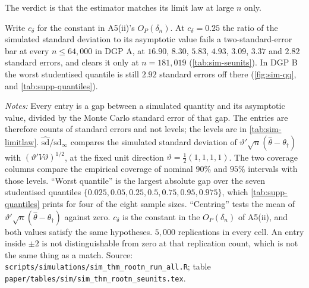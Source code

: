 \documentclass[
  12pt]{article}
\newcommand{\1}[1]{\mathds{1}\left[#1\right]}
\theoremstyle{plain}
\theoremstyle{definition}
\theoremstyle{definition}
\theoremstyle{remark}
\begin{document}
The verdict is that the estimator matches its limit law at large $n$ only.

Write $c_\delta$ for the constant in A5(ii)'s $O_P(\delta_n)$. At $c_\delta=0.25$
the ratio of the simulated standard deviation to its asymptotic value fails a
two-standard-error bar at every $n\le64{,}000$ in DGP A, at $16.90$, $8.30$,
$5.83$, $4.93$, $3.09$, $3.37$ and $2.82$ standard errors, and clears it only at
$n=181{,}019$ (\cref{tab:sim-seunits}). In DGP B the worst studentised
quantile is still $2.92$ standard errors off there
(\cref{fig:sim-qq}, and \cref{tab:supp-quantiles}).

\begin{table}[!htbp]
\centering
\begin{threeparttable}
\caption{Distance from the asymptotic value, in Monte Carlo standard error units}
\label{tab:sim-seunits}
\footnotesize

\begin{tablenotes}\footnotesize
\item \textit{Notes:} Every entry is a gap between a simulated quantity and its
asymptotic value, divided by the Monte Carlo standard error of that gap. The
entries are therefore counts of standard errors and not levels; the levels are in
\cref{tab:sim-limitlaw}. $\hat{\mathrm{sd}}/\mathrm{sd}_\infty$ compares the
simulated standard deviation of $\vartheta'\sqrt n(\hat\theta-\theta_\dagger)$
with $(\vartheta'V\vartheta)^{1/2}$, at the fixed unit direction
$\vartheta=\tfrac12(1,1,1,1)$. The two coverage columns compare the empirical
coverage of nominal $90\%$ and $95\%$ intervals with those levels. ``Worst
quantile'' is the largest absolute gap over the seven studentised quantiles
$\{0.025,0.05,0.25,0.5,0.75,0.95,0.975\}$, which \cref{tab:supp-quantiles}
prints for four of the eight sample sizes. ``Centring'' tests the mean of
$\vartheta'\sqrt n(\hat\theta-\theta_\dagger)$ against zero. $c_\delta$ is the
constant in the $O_P(\delta_n)$ of A5(ii), and both values satisfy the same
hypotheses. $5{,}000$ replications in every cell. An entry inside $\pm2$ is not
distinguishable from zero at that replication count, which is not the same thing
as a match. Source: \texttt{scripts/simulations/sim\_thm\_rootn\_run\_all.R};
table \texttt{paper/tables/sim/sim\_thm\_rootn\_seunits.tex}.
\end{tablenotes}
\end{threeparttable}
\end{table}
\end{document}

